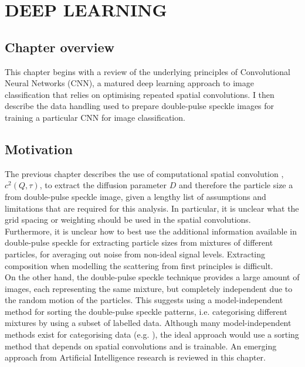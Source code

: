 \addchapheadtotoc
\setlength\parindent{0pt}

\chapter{DEEP LEARNING}

\section{Chapter overview}

This chapter begins with a review of the underlying principles of Convolutional Neural Networks (CNN), a matured deep learning approach to image classification that relies on optimising repeated spatial convolutions. I then describe the data handling used to prepare double-pulse speckle images for training a particular CNN for image classification.\\

\section{Motivation}

The previous chapter describes the use of computational spatial convolution , $c^2(Q,\tau)$, to extract the diffusion parameter $D$ and therefore the particle size a from double-pulse speckle image, given a lengthy list of assumptions and limitations that are required for this analysis.  In particular, it is unclear what the grid spacing or weighting should be used in the spatial convolutions.   Furthermore, it is unclear how to best use the additional information available in double-pulse speckle for extracting particle sizes from mixtures of different particles, for averaging out noise from non-ideal signal levels.  Extracting composition when modelling the scattering from first principles is difficult. \\

On the other hand, the double-pulse speckle technique provides a large amount of images, each representing the same mixture, but completely independent due to the random motion of the particles.  This suggests using a model-independent method for sorting the double-pulse speckle patterns, i.e. categorising different mixtures by using a subset of labelled data.  Although many model-independent methods exist for categorising data (e.g. \citep{Eric}), the ideal approach would use a sorting method that depends on spatial convolutions and is trainable.  An emerging approach from Artificial Intelligence research is reviewed in this chapter. \\

